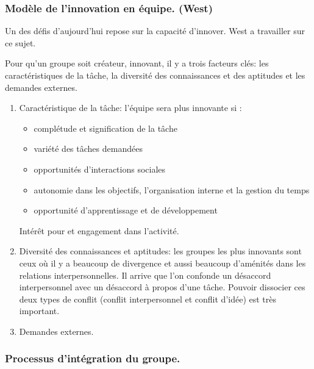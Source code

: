 \documentclass[12pt]{article}
\begin{document}
	
	\subsubsection*{Modèle de l'innovation en équipe. (West)}
	
	Un des défis d'aujourd'hui repose sur la capacité d'innover. West a travailler sur ce sujet. \newline
	
	Pour qu'un groupe soit créateur, innovant, il y a trois facteurs clés: les caractéristiques de la tâche, la diversité des connaissances et des aptitudes et les demandes externes. \newline
	
	\begin{enumerate}
	\item  Caractéristique de la tâche: l'équipe sera plus innovante si :
		\begin{itemize}
		\item complétude et signification de la tâche
		\item variété des tâches demandées
		\item opportunités d'interactions sociales
		\item autonomie dans les objectifs, l'organisation interne et la gestion du temps
		\item opportunité d'apprentissage et de développement
		\end{itemize}
		Intérêt pour et engagement dans l'activité. \newline
	
	\item Diversité des connaissances et aptitudes: les groupes les plus innovants sont ceux où il y a beaucoup de divergence et aussi beaucoup d'aménités dans les relations interpersonnelles. 
	Il arrive que l'on confonde un désaccord interpersonnel avec un désaccord à propos d'une tâche. Pouvoir dissocier ces deux types de conflit (conflit interpersonnel et conflit d'idée) est très important. \newline
	
	\item Demandes externes.
	\end{enumerate}
	
	\subsubsection*{Processus d'intégration du groupe.}
	 
\end{document}
